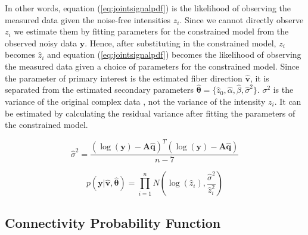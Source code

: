 In other words, equation (\ref{eq:jointsignalpdf}) is the likelihood of observing the measured data given the noise-free intensities $z_i$.  Since we cannot directly observe $z_i$ we estimate them by fitting parameters for the constrained model from the observed noisy data $\mathbf{y}$.  Hence, after substituting in the constrained model, $z_i$ becomes $\hat{z}_i$ and equation (\ref{eq:jointsignalpdf}) becomes the likelihood of observing the measured data given a choice of parameters for the constrained model.  Since the parameter of primary interest is the estimated fiber direction $\mathbf{\hat{v}}$, it is separated from the estimated secondary parameters $\mathbf{\hat{\theta}} = \{\hat{z}_0, \hat{\alpha}, \hat{\beta}, \hat{\sigma}^2\}$.  $\sigma^2$ is the variance of the original complex data \cite{salvador}, not the variance of the intensity $z_i$.  It can be estimated by calculating the residual variance after fitting the parameters of the constrained model.

\begin{equation} \label{eq:ResVar}
\hat{\sigma}^2 = \frac{(\log(\mathbf{y})-\mathbf{A}\hat{\mathbf{q}})^T(\log(\mathbf{y})-\mathbf{A}\hat{\mathbf{q}})}{n - 7}
\end{equation}

\begin{equation} \label{eq:likelihood}
p(\mathbf{y}|\mathbf{\hat{v}},\mathbf{\hat{\theta}}) = \prod_{i=1}^{n}N\left( \log(\hat{z}_i), \frac{\hat{\sigma}^2}{\hat{z}_i^2} \right)
\end{equation}



\subsection{Connectivity Probability Function}
 
